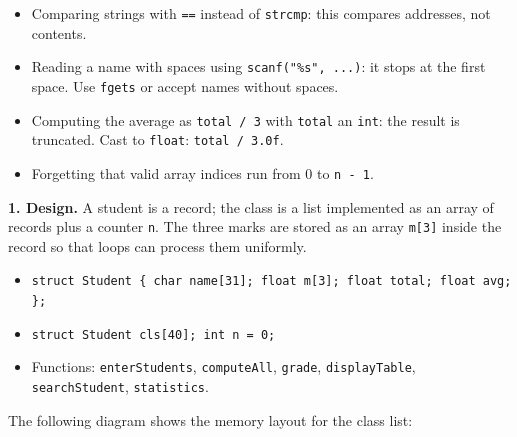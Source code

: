 \documentclass[11pt]{article}
\newcounter{popsec}
\newcounter{popsub}
\newcommand{\courssub}[1]{%
  \stepcounter{popsub}%
  \par\vspace{9pt}\noindent{\popxbold\fontsize{11.5}{13}\selectfont\color{popink}{\color{poporange}\thepopsec.\thepopsub}\hspace{6pt}#1}\par\nopagebreak\vspace{4pt}
}
\begin{document}
\begin{attention}
\begin{itemize}
\item Comparing strings with \texttt{==} instead of \texttt{strcmp}: this compares addresses, not contents.
\item Reading a name with spaces using \texttt{scanf("\%s", ...)}: it stops at the first space. Use \texttt{fgets} or accept names without spaces.
\item Computing the average as \texttt{total / 3} with \texttt{total} an \texttt{int}: the result is truncated. Cast to \texttt{float}: \texttt{total / 3.0f}.
\item Forgetting that valid array indices run from 0 to \texttt{n - 1}.
\end{itemize}
\end{attention}

\courssub{Model answer}

\textbf{1. Design.} A student is a record; the class is a list implemented as an array of records plus a counter \texttt{n}. The three marks are stored as an array \texttt{m[3]} inside the record so that loops can process them uniformly.

\begin{itemize}
\item \texttt{struct Student \{ char name[31]; float m[3]; float total; float avg; \};}
\item \texttt{struct Student cls[40]; int n = 0;}
\item Functions: \texttt{enterStudents}, \texttt{computeAll}, \texttt{grade}, \texttt{displayTable}, \texttt{searchStudent}, \texttt{statistics}.
\end{itemize}

\begin{experience}
The following diagram shows the memory layout for the class list:
\begin{center}
\end{center}
\end{experience}
\end{document}
